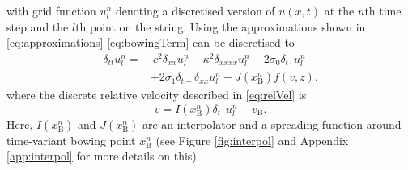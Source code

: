 \documentclass[twoside,a4paper]{article}
\begin{document}
with grid function $u_l^n$ denoting a discretised version of $u(x,t)$ at the $n$th time step and the $l$th point on the string. Using the approximations shown in \eqref{eq:approximations} \eqref{eq:bowingTerm} can be discretised to
\begin{equation}
  \begin{aligned}
    \label{eq:FDS}
        \delta_{tt} u_l^n = &\: c^2 \delta_{xx} u_l^n -\kappa^2\delta_{xxxx} u_l^n - 2\sigma_0\delta_{t\cdot} u_l^n
        \\ 
        &+ 2\sigma_1\delta_{t-}\delta_{xx}u_l^n - J(x_\text{B}^n)f(v, z).
    \end{aligned}
\end{equation}
where the discrete relative velocity described in \eqref{eq:relVel} is
\begin{equation}\label{eq:discRelVel}
v = I(x_\text{B}^n)\delta_{t\cdot}u_l^n -  v_\text{B}.
\end{equation}
Here, $I(x_\text{B}^n)$ and $J(x_\text{B}^n)$ are an interpolator and a spreading function around time-variant bowing point $x_\text{B}^n$ (see Figure \ref{fig:interpol} and Appendix \ref{app:interpol} for more details on this).
     
    
\end{document}
